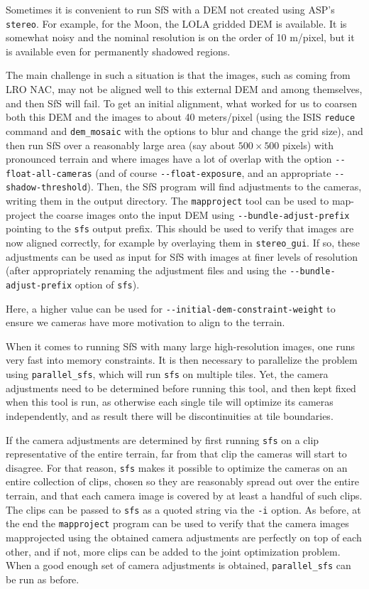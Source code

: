 Sometimes it is convenient to run SfS with a DEM not created using ASP's
\texttt{stereo}. For example, for the Moon, the LOLA gridded DEM is
available. It is somewhat noisy and the nominal resolution is on the
order of 10 m/pixel, but it is available even for permanently shadowed
regions.

The main challenge in such a situation is that the images, such as
coming from LRO NAC, may not be aligned well to this external DEM and
among themselves, and then SfS will fail. To get an initial alignment,
what worked for us to coarsen both this DEM and the images to about 40
meters/pixel (using the ISIS \texttt{reduce} command and
\texttt{dem\_mosaic} with the options to blur and change the grid size),
and then run SfS over a reasonably large area (say about $500 \times
500$ pixels) with pronounced terrain and where images have a lot of
overlap with the option \texttt{-\/-float-all-cameras} (and of course
\texttt{-\/-float-exposure}, and an appropriate \texttt{-\/-shadow-threshold}). 
Then, the SfS program will find
adjustments to the cameras, writing them in the output directory. The
\texttt{mapproject} tool can be used to map-project the coarse images
onto the input DEM using \texttt{-\/-bundle-adjust-prefix} pointing to
the \texttt{sfs} output prefix. This should be used to verify that images
are now aligned correctly, for example by overlaying them in
\texttt{stereo\_gui}. If so, these adjustments can be used as input for
SfS with images at finer levels of resolution (after appropriately renaming the
adjustment files and using the \texttt{-\/-bundle-adjust-prefix} option of \texttt{sfs}).

Here, a higher value can be used for \texttt{-\/-initial-dem-constraint-weight}
to ensure we cameras have more motivation to align to the terrain.

When it comes to running SfS with many large high-resolution
images, one runs very fast into memory constraints. It is then necessary
to parallelize the problem using \texttt{parallel\_sfs}, which will run
\texttt{sfs} on multiple tiles. Yet, the camera adjustments need to be
determined before running this tool, and then kept fixed when this tool
is run, as otherwise each single tile will optimize its cameras
independently, and as result there will be discontinuities at tile
boundaries. 

If the camera adjustments are determined by first running \texttt{sfs}
on a clip representative of the entire terrain, far from that clip the
cameras will start to disagree. For that reason, \texttt{sfs} makes it
possible to optimize the cameras on an entire collection of clips,
chosen so they are reasonably spread out over the entire terrain, 
and that each camera image is covered by at least a handful of such clips.
The clips can be passed to \texttt{sfs} as a quoted string via the \texttt{-i} option. 
As before, at the end the \texttt{mapproject}
program can be used to verify that the camera images mapprojected using the
obtained camera adjustments are perfectly on top of each other, and if not,
more clips can be added to the joint optimization problem. When a good
enough set of camera adjustments is obtained, \texttt{parallel\_sfs} can
be run as before. 

